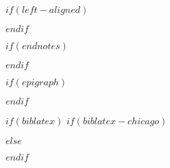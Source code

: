 
\usepackage{etoolbox}


$if(left-aligned)$
\usepackage[document]{ragged2e}
\setlength{\RaggedRightParindent}{\parindent}
\setlength{\RaggedRightRightskip}{0pt plus 3em}

$endif$

$if(endnotes)$
\usepackage{endnotes}
\renewcommand{\enotesize}{\normalsize}
\let\footnote=\endnote
$endif$


\usepackage{fancyhdr}
\setlength{\headheight}{0.25in}
\renewcommand{\headrulewidth}{0pt}  %
\renewcommand{\footrulewidth}{0pt}



\pagestyle{normal}


$if(epigraph)$
\usepackage{epigraph}
\renewcommand{\epigraphsize}{\footnotesize}
\setlength{\epigraphrule}{0em}
\setlength{\beforeepigraphskip}{0em}
\setlength{\afterepigraphskip}{1em}
$endif$

$if(biblatex)$
$if(biblatex-chicago)$
\usepackage[$if(biblio-style)$$biblio-style$,$endif$$for(biblatexoptions)$$biblatexoptions$$sep$,$endfor$]{biblatex-chicago}
$else$
\usepackage[$if(biblio-style)$style=$biblio-style$,$endif$$for(biblatexoptions)$$biblatexoptions$$sep$,$endfor$]{biblatex}
$endif$

\setlength\bibitemsep{0pt}  %
\setlength\bibhang{\parindent}  %


